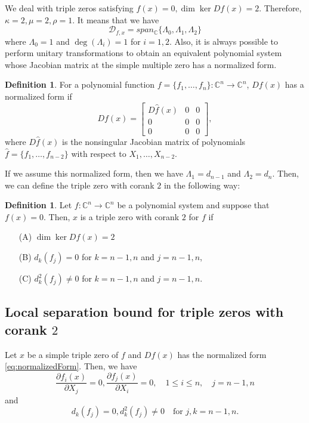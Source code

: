 \documentclass[12pt,oneside,reqno]{amsart}
\theoremstyle{definition}
\newtheorem{defi}[thm]{Definition}
\begin{document}
We deal with triple zeros satisfying $f(x)=0, \dim \ker Df(x)=2$. Therefore, $\kappa=2, \mu=2, \rho =1$.
It means that we have 
\[\mathcal{D}_{f,x}=span_\mathbb{C}\{\Lambda_0,\Lambda_1,\Lambda_2\}\]
where $\Lambda_0=1$ and $\deg(\Lambda_i)=1$ for $i=1,2$. Also, it is always possible to perform unitary transformations to obtain an equivalent polynomial system whose Jacobian matrix at the simple multiple zero has a normalized form.
\begin{defi}
	For a polynomial function $f=\{f_1,\dots, f_n\}:\mathbb{C}^n\rightarrow\mathbb{C}^n$, $Df(x)$ has a normalized form if 
	\[Df(x)=\begin{bmatrix}
	D\hat{f}(x) & 0 & 0\\
	0 & 0 & 0 \\
	0 & 0 & 0
	\end{bmatrix},\label{eq:normalizedForm}\]
	where $D\hat{f}(x)$ is the nonsingular Jacobian matrix of polynomials $\hat{f}=\{f_1,\dots, f_{n-2}\}$ with respect to $X_1,\dots, X_{n-2}$.
\end{defi}


If we assume this normalized form, then we have $\Lambda_1=d_{n-1}$ and $\Lambda_2=d_n$. Then, we can define the triple zero with corank $2$ in the following way:
\begin{defi}
 Let $f:\mathbb{C}^n\rightarrow\mathbb{C}^n$ be a polynomial system and suppose that $f(x)=0$. Then, $x$ is a triple zero with corank $2$ for $f$ if
 \begin{itemize}
 	\item[(A)] $\dim\ker Df(x)=2$
 	\item[(B)] $d_k(f_j)=0$ for $k=n-1,n$ and $j=n-1,n$,
 	\item[(C)] $d_k^2(f_j)\ne0$ for $k=n-1,n$ and $j=n-1,n$.
 	\end{itemize}
	
\end{defi}


\subsection{Local separation bound for triple zeros with corank $2$}
Let $x$ be a simple triple zero of $f$ and $Df(x)$ has the normalized form \ref{eq:normalizedForm}. Then, we have 
\[\frac{\partial f_i(x)}{\partial X_j}=0, \frac{\partial f_j(x)}{\partial X_i}=0, \quad 1\leq i\leq n,\quad j=n-1,n\]
and
\[d_k(f_j)=0, d_k^2(f_j)\ne 0\quad \text{for }j,k=n-1,n.\]
\end{document}

